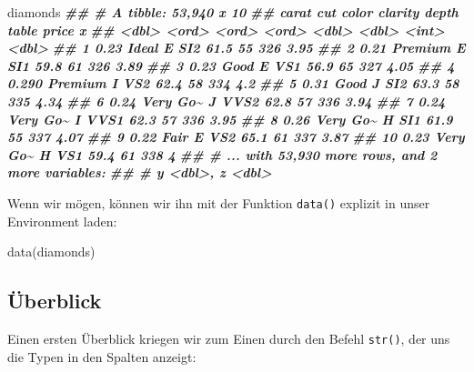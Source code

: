 \documentclass[11pt,german,a4paper]{article}
\newenvironment{Shaded}{\begin{snugshade}}{\end{snugshade}}
\newcommand{\DocumentationTok}[1]{\textcolor[rgb]{0.56,0.35,0.01}{\textbf{\textit{#1}}}}
\newcommand{\FunctionTok}[1]{\textcolor[rgb]{0.00,0.00,0.00}{#1}}
\newcommand{\NormalTok}[1]{#1}
\begin{document}
\begin{Shaded}
\begin{Highlighting}[]
\NormalTok{diamonds}
\DocumentationTok{\#\# \# A tibble: 53,940 x 10}
\DocumentationTok{\#\#    carat cut      color clarity depth table price     x}
\DocumentationTok{\#\#    \textless{}dbl\textgreater{} \textless{}ord\textgreater{}    \textless{}ord\textgreater{} \textless{}ord\textgreater{}   \textless{}dbl\textgreater{} \textless{}dbl\textgreater{} \textless{}int\textgreater{} \textless{}dbl\textgreater{}}
\DocumentationTok{\#\#  1 0.23  Ideal    E     SI2      61.5    55   326  3.95}
\DocumentationTok{\#\#  2 0.21  Premium  E     SI1      59.8    61   326  3.89}
\DocumentationTok{\#\#  3 0.23  Good     E     VS1      56.9    65   327  4.05}
\DocumentationTok{\#\#  4 0.290 Premium  I     VS2      62.4    58   334  4.2 }
\DocumentationTok{\#\#  5 0.31  Good     J     SI2      63.3    58   335  4.34}
\DocumentationTok{\#\#  6 0.24  Very Go\textasciitilde{} J     VVS2     62.8    57   336  3.94}
\DocumentationTok{\#\#  7 0.24  Very Go\textasciitilde{} I     VVS1     62.3    57   336  3.95}
\DocumentationTok{\#\#  8 0.26  Very Go\textasciitilde{} H     SI1      61.9    55   337  4.07}
\DocumentationTok{\#\#  9 0.22  Fair     E     VS2      65.1    61   337  3.87}
\DocumentationTok{\#\# 10 0.23  Very Go\textasciitilde{} H     VS1      59.4    61   338  4   }
\DocumentationTok{\#\# \# ... with 53,930 more rows, and 2 more variables:}
\DocumentationTok{\#\# \#   y \textless{}dbl\textgreater{}, z \textless{}dbl\textgreater{}}
\end{Highlighting}
\end{Shaded}

Wenn wir mögen, können wir ihn mit der Funktion \texttt{data()} explizit in unser Environment laden:

\begin{Shaded}
\begin{Highlighting}[]
\FunctionTok{data}\NormalTok{(diamonds)}
\end{Highlighting}
\end{Shaded}

\hypertarget{uxfcberblick-1}{%
\subsection{Überblick}\label{uxfcberblick-1}}

Einen ersten Überblick kriegen wir zum Einen durch den Befehl \texttt{str()}, der uns die Typen in den Spalten anzeigt:
\end{document}
